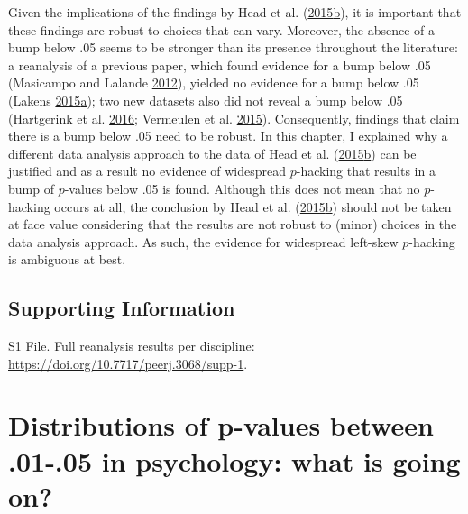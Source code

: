 \documentclass[a5paper]{book}
\begin{document}
Given the implications of the findings by Head et al.
(\protect\hyperlink{ref-doi:10.1371ux2fjournal.pbio.1002106}{2015}\protect\hyperlink{ref-doi:10.1371ux2fjournal.pbio.1002106}{b}),
it is important that these findings are robust to choices that can vary.
Moreover, the absence of a bump below .05 seems to be stronger than its
presence throughout the literature: a reanalysis of a previous paper,
which found evidence for a bump below .05 (Masicampo and Lalande
\protect\hyperlink{ref-doi:10.1080ux2f17470218.2012.711335}{2012}),
yielded no evidence for a bump below .05 (Lakens
\protect\hyperlink{ref-doi:10.1080ux2f17470218.2014.982664}{2015}\protect\hyperlink{ref-doi:10.1080ux2f17470218.2014.982664}{a});
two new datasets also did not reveal a bump below .05 (Hartgerink et al.
\protect\hyperlink{ref-doi:10.7717ux2fpeerj.1935}{2016}; Vermeulen et
al. \protect\hyperlink{ref-doi:10.1080ux2f19312458.2015.1096333}{2015}).
Consequently, findings that claim there is a bump below .05 need to be
robust. In this chapter, I explained why a different data analysis
approach to the data of Head et al.
(\protect\hyperlink{ref-doi:10.1371ux2fjournal.pbio.1002106}{2015}\protect\hyperlink{ref-doi:10.1371ux2fjournal.pbio.1002106}{b})
can be justified and as a result no evidence of widespread \(p\)-hacking
that results in a bump of \(p\)-values below .05 is found. Although this
does not mean that no \(p\)-hacking occurs at all, the conclusion by
Head et al.
(\protect\hyperlink{ref-doi:10.1371ux2fjournal.pbio.1002106}{2015}\protect\hyperlink{ref-doi:10.1371ux2fjournal.pbio.1002106}{b})
should not be taken at face value considering that the results are not
robust to (minor) choices in the data analysis approach. As such, the
evidence for widespread left-skew \(p\)-hacking is ambiguous at best.

\section{Supporting Information}\label{supporting-information}

S1 File. Full reanalysis results per discipline:
\url{https://doi.org/10.7717/peerj.3068/supp-1}.

\chapter{Distributions of p-values between .01-.05 in psychology: what
is going
on?}\label{distributions-of-p-values-between-.01-.05-in-psychology-what-is-going-on}
\end{document}
